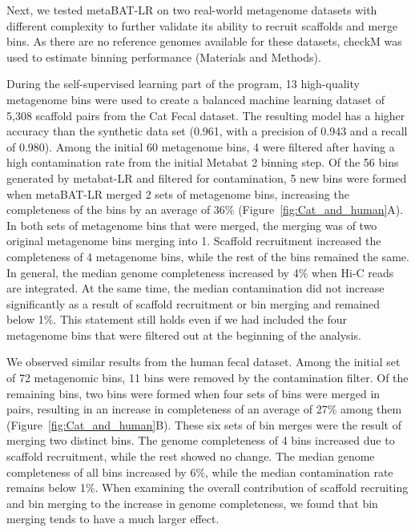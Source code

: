 \documentclass[fleqn,10pt,lineno]{wlpeerj}
\begin{document}
Next, we tested metaBAT-LR on two real-world metagenome datasets with different complexity to further validate its ability to recruit scaffolds and merge bins. As there are no reference genomes available for these datasets, checkM was used to estimate binning performance (Materials and Methods). 

During the self-supervised learning part of the program, 13 high-quality metagenome bins were used to create a balanced machine learning dataset of 5,308 scaffold pairs from the Cat Fecal dataset. The resulting model has a higher accuracy than the synthetic data set (0.961, with a precision of 0.943 and a recall of 0.980). Among the initial 60 metagenome bins, 4 were filtered after having a high contamination rate from the initial Metabat 2 binning step. Of the 56 bins generated by metabat-LR and filtered for contamination, 5 new bins were formed when metaBAT-LR merged 2 sets of metagenome bins, increasing the completeness of the bins by an average of 36\% (Figure~\ref{fig:Cat_and_human}A). In both sets of metagenome bins that were merged, the merging was of two original metagenome bins merging into 1. Scaffold recruitment increased the completeness of 4 metagenome bins, while the rest of the bins remained the same. In general, the median genome completeness increased by 4\% when Hi-C reads are integrated. At the same time, the median contamination did not increase significantly as a result of scaffold recruitment or bin merging and remained below 1\%. This statement still holds even if we had included the four metagenome bins that were filtered out at the beginning of the analysis.     

We observed similar results from the human fecal dataset. Among the initial set of 72 metagenomic bins, 11 bins were removed by the contamination filter. Of the remaining bins, two bins were formed when four sets of bins were merged in pairs, resulting in an increase in completeness of an average of 27\% among them (Figure~\ref{fig:Cat_and_human}B). These six sets of bin merges were the result of merging two distinct bins. The genome completeness of 4 bins increased due to scaffold recruitment, while the rest showed no change. The median genome completeness of all bins increased by 6\%, while the median contamination rate remains below 1\%. When examining the overall contribution of scaffold recruiting and bin merging to the increase in genome completeness, we found that bin merging tends to have a much larger effect.

\end{document}
